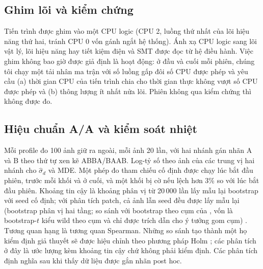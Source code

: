 \documentclass[a4paper,fleqn]{cas-dc}
\begin{document}
\subsection{Ghim lõi và kiểm chứng}
Tiến trình được ghim vào một CPU logic (CPU 2, luồng thứ nhất của lõi hiệu năng thứ hai, tránh CPU 0 vốn gánh ngắt hệ thống). Ánh xạ CPU logic sang lõi vật lý, lõi hiệu năng hay tiết kiệm điện và SMT được đọc từ hệ điều hành. Việc ghim không bao giờ được giả định là hoạt động: ở đầu và cuối mỗi phiên, chúng tôi chạy một tải nhân ma trận với số luồng gấp đôi số CPU được phép và yêu cầu (a) thời gian CPU của tiến trình chia cho thời gian thực không vượt số CPU được phép và (b) thông lượng ít nhất nửa lõi. Phiên không qua kiểm chứng thì không được đo.

\subsection{Hiệu chuẩn A/A và kiểm soát nhiệt}
Mỗi profile đo 100 ảnh giữ ra ngoài, mỗi ảnh 20 lần, với hai nhánh gán nhãn A và B theo thứ tự xen kẽ ABBA/BAAB. Log-tỷ số theo ảnh của các trung vị hai nhánh cho $\hat\sigma_d$ và MDE. Một phép đo tham chiếu cố định được chạy lúc bắt đầu phiên, trước mỗi khối và ở cuối, và một khối bị cờ nếu lệch hơn 3\% so với lúc bắt đầu phiên. Khoảng tin cậy là khoảng phân vị từ 20\,000 lần lấy mẫu lại bootstrap với seed cố định; với phân tích patch, cả ảnh lẫn seed đều được lấy mẫu lại (bootstrap phân vị hai tầng; so sánh với bootstrap theo cụm của \cite{cameron2008cluster}, vốn là bootstrap-$t$ kiểu wild theo cụm và chỉ được trích dẫn cho ý tưởng gom cụm) \cite{efron1979bootstrap}. Tương quan hạng là tương quan Spearman. Những so sánh tạo thành một họ kiểm định giả thuyết sẽ được hiệu chỉnh theo phương pháp Holm \cite{holm1979}; các phân tích ở đây là ước lượng kèm khoảng tin cậy chứ không phải kiểm định. Các phân tích định nghĩa sau khi thấy dữ liệu được gắn nhãn post hoc.
\end{document}

